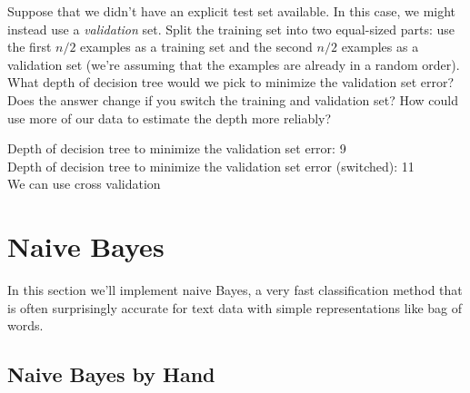 \documentclass{article}
\def\blu#1{{\color{blu}#1}}
\def\red#1{{\color{red}#1}}
\begin{document}
Suppose that we didn't have an explicit test set available. In this case, we might instead use a \emph{validation} set. Split the training set into two equal-sized parts: use the first $n/2$ examples as a training set and the second $n/2$ examples as a validation set (we're assuming that the examples are already in a random order). \blu{What depth of decision tree would we pick to minimize the validation set error? Does the answer change if you switch the training and validation set? How could use more of our data to  estimate the depth more reliably?}

\red{Depth of decision tree to minimize the validation set error: 9} \\
\red{Depth of decision tree to minimize the validation set error (switched): 11} \\
\red{We can use cross validation}
\section{Naive Bayes}

In this section we'll implement naive Bayes, a very fast classification method that is often surprisingly accurate for text data with simple representations like bag of words.



\subsection{Naive Bayes by Hand}
\end{document}
